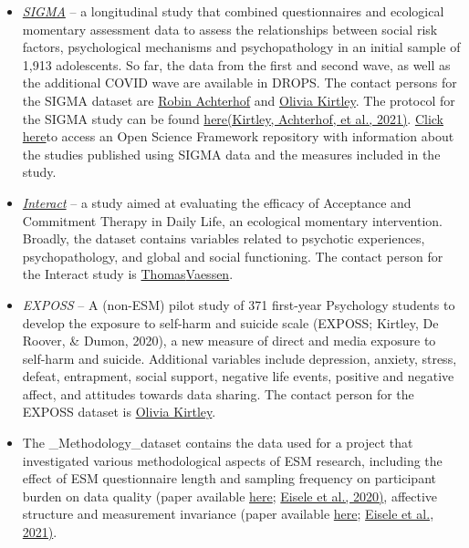 \documentclass[
]{article}
\begin{document}
\begin{itemize}
\item
  \href{https://gbiomed.kuleuven.be/english/research/50000666/50000673/cpp/research-1/social-interaction/sigma/index.htm}{\emph{SIGMA}}
  --⁠ a longitudinal study that combined questionnaires and ecological
  momentary assessment data to assess the relationships between social
  risk factors, psychological mechanisms and psychopathology in an
  initial sample of 1,913 adolescents. So far, the data from the first
  and second wave, as well as the additional COVID wave are available in
  DROPS. The contact persons for the SIGMA dataset are
  \href{https://www.kuleuven.be/wieiswie/nl/person/00115655}{Robin
  Achterhof} and
  \href{https://www.kuleuven.be/wieiswie/nl/person/00117419}{Olivia
  Kirtley}. The protocol for the SIGMA study can be found
  \href{https://psyarxiv.com/jp2fk/}{here}\href{https://www.zotero.org/google-docs/?agskoG}{(Kirtley,
  Achterhof, et al., 2021)}. \href{https://osf.io/xwvc5/}{Click here}to
  access an Open Science Framework repository with information about the
  studies published using SIGMA data and the measures included in the
  study.
\item
  \href{https://pubmed.ncbi.nlm.nih.gov/31878966/}{\emph{Interact}} -- a
  study aimed at evaluating the efficacy of Acceptance and Commitment
  Therapy in Daily Life, an ecological momentary intervention. Broadly,
  the dataset contains variables related to psychotic experiences,
  psychopathology, and global and social functioning. The contact person
  for the Interact study is
  \href{https://www.kuleuven.be/wieiswie/nl/person/00106722}{Thomas}\href{https://www.kuleuven.be/wieiswie/nl/person/00106722}{Vaessen}.
\item
  \emph{EXPOSS} -- A (non-ESM) pilot study of 371 first-year Psychology
  students to develop the exposure to self-harm and suicide scale
  (EXPOSS; Kirtley, De Roover, \& Dumon, 2020), a new measure of direct
  and media exposure to self-harm and suicide. Additional variables
  include depression, anxiety, stress, defeat, entrapment, social
  support, negative life events, positive and negative affect, and
  attitudes towards data sharing. The contact person for the EXPOSS
  dataset is
  \href{https://www.kuleuven.be/wieiswie/nl/person/00117419}{Olivia
  Kirtley}.
\item
  The \_Methodology\_dataset contains the data used for a project that
  investigated various methodological aspects of ESM research, including
  the effect of ESM questionnaire length and sampling frequency on
  participant burden on data quality (paper available
  \href{https://journals.sagepub.com/doi/10.1177/1073191120957102}{here};
  \href{https://www.zotero.org/google-docs/?UNkfRy}{Eisele et al.,
  2020)}, affective structure and measurement invariance (paper
  available
  \href{https://www.sciencedirect.com/science/article/pii/S0092656621000313?casa_token=Z6l7hIkmucUAAAAA:VLP3vqtJO_7lx2BKclkfVwFGg3F1LkEuTUvHGo8DLSna_pBUR-pjJVbuMHkbfafEnijEkHmfEcQ}{here};
  \href{https://www.zotero.org/google-docs/?rllNl0}{Eisele et al.,
  2021)}.
\end{itemize}
\end{document}
